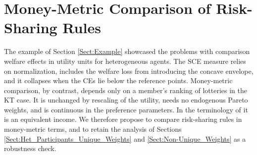 \section{Money-Metric Comparison of Risk-Sharing Rules}
\label{Sect:Money_Metric_Comparison}
The example of Section \ref{Sect:Example} showcased the problems with comparison welfare effects in utility units for heterogeneous agents. The SCE measure relies on normalization, includes the welfare loss from introducing the concave envelope, and it collapses when the CEs lie below the reference points. Money-metric comparison, by contrast, depends only on a member's ranking of lotteries in the KT case. It is unchanged by rescaling of the utility, needs no endogenous Pareto weights, and is continuous in the preference parameters. In the terminology of \citet{Fleurbaey2009} it is an equivalent income. We therefore propose to compare risk-sharing rules in money-metric terms, and to retain the analysis of Sections \ref{Sect:Het_Participants_Unique_Weights} and \ref{Sect:Non-Unique_Weights} as a robustness check.

